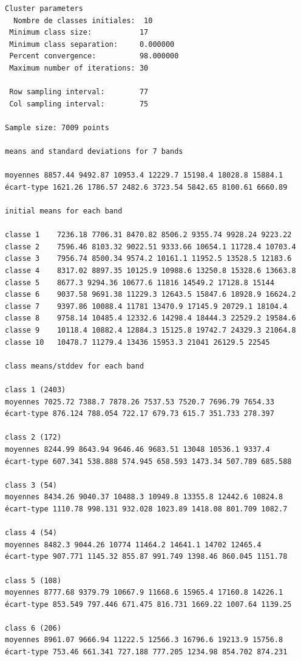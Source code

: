 \documentclass[earth,article,submit,pdftex,moreauthors]{Definitions/mdpi}
\begin{document}
{\begin{scriptsize}
\begin{verbatim}
Cluster parameters
  Nombre de classes initiales: 	10
 Minimum class size:           17
 Minimum class separation:     0.000000
 Percent convergence:          98.000000
 Maximum number of iterations: 30

 Row sampling interval:        77
 Col sampling interval:        75

Sample size: 7009 points

means and standard deviations for 7 bands

moyennes 8857.44 9492.87 10953.4 12229.7 15198.4 18028.8 15884.1
écart-type 1621.26 1786.57 2482.6 3723.54 5842.65 8100.61 6660.89

initial means for each band

classe 1    7236.18 7706.31 8470.82 8506.2 9355.74 9928.24 9223.22
classe 2    7596.46 8103.32 9022.51 9333.66 10654.1 11728.4 10703.4
classe 3    7956.74 8500.34 9574.2 10161.1 11952.5 13528.5 12183.6
classe 4    8317.02 8897.35 10125.9 10988.6 13250.8 15328.6 13663.8
classe 5    8677.3 9294.36 10677.6 11816 14549.2 17128.8 15144
classe 6    9037.58 9691.38 11229.3 12643.5 15847.6 18928.9 16624.2
classe 7    9397.86 10088.4 11781 13470.9 17145.9 20729.1 18104.4
classe 8    9758.14 10485.4 12332.6 14298.4 18444.3 22529.2 19584.6
classe 9    10118.4 10882.4 12884.3 15125.8 19742.7 24329.3 21064.8
classe 10   10478.7 11279.4 13436 15953.3 21041 26129.5 22545

class means/stddev for each band

class 1 (2403)
moyennes 7025.72 7388.7 7878.26 7537.53 7520.7 7696.79 7654.33
écart-type 876.124 788.054 722.17 679.73 615.7 351.733 278.397

class 2 (172)
moyennes 8244.99 8643.94 9646.46 9683.51 13048 10536.1 9337.4
écart-type 607.341 538.888 574.945 658.593 1473.34 507.789 685.588

class 3 (54)
moyennes 8434.26 9040.37 10488.3 10949.8 13355.8 12442.6 10824.8
écart-type 1110.78 998.131 932.028 1023.89 1418.08 801.709 1082.7

class 4 (54)
moyennes 8482.3 9044.26 10774 11464.2 14641.1 14702 12465.4
écart-type 907.771 1145.32 855.87 991.749 1398.46 860.045 1151.78

class 5 (108)
moyennes 8777.68 9379.79 10667.9 11668.6 15965.4 17160.8 14226.1
écart-type 853.549 797.446 671.475 816.731 1669.22 1007.64 1139.25

class 6 (206)
moyennes 8961.07 9666.94 11222.5 12566.3 16796.6 19213.9 15756.8
écart-type 753.46 661.341 727.188 777.205 1234.98 854.702 874.231


\end{verbatim}
\end{scriptsize}}
\end{document}
